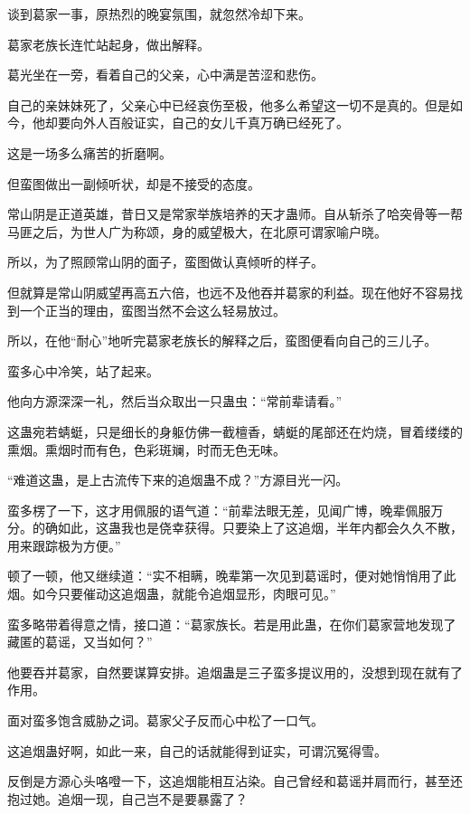 
\begin{this_body}

谈到葛家一事，原热烈的晚宴氛围，就忽然冷却下来。

葛家老族长连忙站起身，做出解释。

葛光坐在一旁，看着自己的父亲，心中满是苦涩和悲伤。

自己的亲妹妹死了，父亲心中已经哀伤至极，他多么希望这一切不是真的。但是如今，他却要向外人百般证实，自己的女儿千真万确已经死了。

这是一场多么痛苦的折磨啊。

但蛮图做出一副倾听状，却是不接受的态度。

常山阴是正道英雄，昔日又是常家举族培养的天才蛊师。自从斩杀了哈突骨等一帮马匪之后，为世人广为称颂，身的威望极大，在北原可谓家喻户晓。

所以，为了照顾常山阴的面子，蛮图做认真倾听的样子。

但就算是常山阴威望再高五六倍，也远不及他吞并葛家的利益。现在他好不容易找到一个正当的理由，蛮图当然不会这么轻易放过。

所以，在他“耐心”地听完葛家老族长的解释之后，蛮图便看向自己的三儿子。

蛮多心中冷笑，站了起来。

他向方源深深一礼，然后当众取出一只蛊虫：“常前辈请看。”

这蛊宛若蜻蜓，只是细长的身躯仿佛一截檀香，蜻蜓的尾部还在灼烧，冒着缕缕的熏烟。熏烟时而有色，色彩斑斓，时而无色无味。

“难道这蛊，是上古流传下来的追烟蛊不成？”方源目光一闪。

蛮多楞了一下，这才用佩服的语气道：“前辈法眼无差，见闻广博，晚辈佩服万分。的确如此，这蛊我也是侥幸获得。只要染上了这追烟，半年内都会久久不散，用来跟踪极为方便。”

顿了一顿，他又继续道：“实不相瞒，晚辈第一次见到葛谣时，便对她悄悄用了此烟。如今只要催动这追烟蛊，就能令追烟显形，肉眼可见。”

蛮多略带着得意之情，接口道：“葛家族长。若是用此蛊，在你们葛家营地发现了藏匿的葛谣，又当如何？”

他要吞并葛家，自然要谋算安排。追烟蛊是三子蛮多提议用的，没想到现在就有了作用。

面对蛮多饱含威胁之词。葛家父子反而心中松了一口气。

这追烟蛊好啊，如此一来，自己的话就能得到证实，可谓沉冤得雪。

反倒是方源心头咯噔一下，这追烟能相互沾染。自己曾经和葛谣并肩而行，甚至还抱过她。追烟一现，自己岂不是要暴露了？


\end{this_body}
